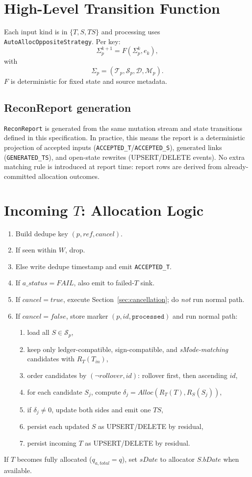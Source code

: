 \documentclass[sigconf]{acmart}
\begin{document}
\section{High-Level Transition Function}
Each input kind is in $\{T,S,TS\}$ and processing uses
\texttt{AutoAllocOpposite}\linebreak\texttt{Strategy}.
Per key:
\[
\Sigma^{k+1}_p = F(\Sigma^k_p,e_k),
\]
with
\[
\Sigma_p=(\mathcal{T}_p,\mathcal{S}_p,\mathcal{D},\mathcal{M}_p).
\]
$F$ is deterministic for fixed state and source metadata.

\subsection{ReconReport generation}
\texttt{ReconReport} is generated from the same mutation stream and state transitions defined in this specification.
In practice, this means the report is a deterministic projection of accepted inputs (\texttt{ACCEPTED\_T}/\texttt{ACCEPTED\_S}), generated links (\texttt{GENERATED\_TS}), and open-state rewrites (UPSERT/DELETE events).
No extra matching rule is introduced at report time: report rows are derived from already-committed allocation outcomes.

\section{Incoming $T$: Allocation Logic}\label{sec:incoming-t}
\begin{enumerate}[leftmargin=*]
  \item Build dedupe key $(p,ref,cancel)$.
  \item If seen within $W$, drop.
  \item Else write dedupe timestamp and emit \texttt{ACCEPTED\_T}.
  \item If $a\_status=FAIL$, also emit to failed-$T$ sink.
  \item If $cancel=true$, execute Section~\ref{sec:cancellation}; do \emph{not} run normal path.
  \item If $cancel=false$, store marker $(p,id,\texttt{processed})$ and run normal path:
  \begin{enumerate}[label=\alph*.,leftmargin=*]
    \item load all $S\in\mathcal{S}_p$,
    \item keep only ledger-compatible, sign-compatible, and \emph{sMode-matching} candidates with $R_T(T_{in})$,
    \item order candidates by $(\neg rollover,id)$: rollover first, then ascending $id$,
    \item for each candidate $S_j$, compute $\delta_j=Alloc(R_T(T),R_S(S_j))$,
    \item if $\delta_j\neq 0$, update both sides and emit one $TS$,
    \item persist each updated $S$ as UPSERT/DELETE by residual,
    \item persist incoming $T$ as UPSERT/DELETE by residual.
  \end{enumerate}
\end{enumerate}
If $T$ becomes fully allocated ($q_{a,total}=q$), set $sDate$ to allocator $S.bDate$ when available.
\end{document}
